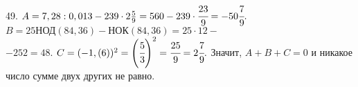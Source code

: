 49. $A=7,28:0,013-239\cdot2\frac{5}{9}=560-239\cdot\cfrac{23}{9}=-50\cfrac{7}{9}.$ $B=25\text{НОД}(84, 36)-\text{НОК}(84,36)=25\cdot12-$\\$-252=48.$
$C=(-1,(6))^2=\left(\cfrac{5}{3}\right)^2=\cfrac{25}{9}=2\cfrac{7}{9}.$ Значит, $A+B+C=0$ и никакое число сумме двух других не равно.\\
